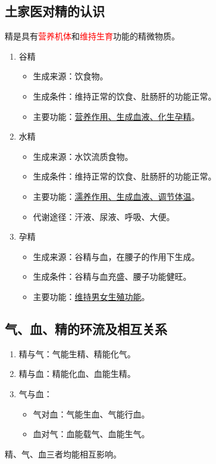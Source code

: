 \documentclass[cn,hazy,blue,12pt,normal,founder]{elegantnote}
\newcommand{\redt}[1]{\textcolor{red}{{}#1}}      %
\begin{document}
\subsection{土家医对精的认识}

精是具有\redt{营养机体}和\redt{维持生育}功能的精微物质。

\begin{enumerate}
  \item 谷精
  \begin{itemize}
    \item 生成来源：饮食物。
    \item 生成条件：维持正常的饮食、肚肠肝的功能正常。
    \item 主要功能：\uline{营养作用、生成血液、化生孕精}。
  \end{itemize}
  \item 水精
  \begin{itemize}
    \item 生成来源：水饮流质食物。
    \item 生成条件：维持正常的饮食、肚肠肝的功能正常。
    \item 主要功能：\uline{濡养作用、生成血液、调节体温}。
    \item 代谢途径：汗液、尿液、呼吸、大便。
  \end{itemize}
  \item 孕精
  \begin{itemize}
    \item 生成来源：谷精与血，在腰子的作用下生成。
    \item 生成条件：谷精与血充盛、腰子功能健旺。
    \item 主要功能：\uline{维持男女生殖功能}。
  \end{itemize}
\end{enumerate}

\subsection{气、血、精的环流及相互关系}

\begin{enumerate}
  \item 精与气：气能生精、精能化气。
  \item 精与血：精能化血、血能生精。
  \item 气与血：
  \begin{itemize}
    \item 气对血：气能生血、气能行血。
    \item 血对气：血能载气、血能生气。
  \end{itemize}
\end{enumerate}
\begin{note}
  精、气、血三者均能相互影响。
\end{note}
\end{document}
